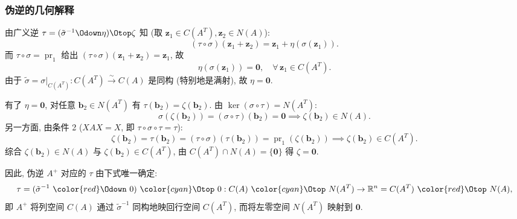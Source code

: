 
\begin{frame}
\frametitle{伪逆的几何解释}

{\color{red}} 由广义逆 $\tau = (\tilde{\sigma}^{-1} \Odown \eta) \Otop \zeta$ 知 (取 $\mathbf{z}_1 \in C(A^T), \mathbf{z}_2 \in N(A)$):
\[
(\tau\circ\sigma)(\mathbf{z}_1 + \mathbf{z}_2) = \mathbf{z}_1 + \eta(\sigma(\mathbf{z}_1)).
\]
而 $\tau\circ\sigma = \operatorname{pr}_1$ 给出 $(\tau\circ\sigma)(\mathbf{z}_1 + \mathbf{z}_2) = \mathbf{z}_1$, 故
\[
\eta(\sigma(\mathbf{z}_1)) = \mathbf{0}, \quad \forall\, \mathbf{z}_1 \in C(A^T).
\]
由于 $\tilde{\sigma} = \sigma|_{C(A^T)}: C(A^T) \overset{\sim}{\to} C(A)$ 是同构 (特别地是满射), 故 $\eta = \mathbf{0}$.

\pause
\vspace{0.5em}

{\color{red}} 有了 $\eta = \mathbf{0}$, 对任意 $\mathbf{b}_2 \in N(A^T)$ 有 $\tau(\mathbf{b}_2) = \zeta(\mathbf{b}_2)$. 由 $\ker(\sigma\circ\tau) = N(A^T)$:
\[
\sigma(\zeta(\mathbf{b}_2)) = (\sigma\circ\tau)(\mathbf{b}_2) = \mathbf{0} \implies \zeta(\mathbf{b}_2) \in N(A).
\]
另一方面, 由条件 2 ($XAX = X$, 即 $\tau\circ\sigma\circ\tau = \tau$):
\[
\zeta(\mathbf{b}_2) = \tau(\mathbf{b}_2) = (\tau\circ\sigma)\left(\tau(\mathbf{b}_2)\right) = \operatorname{pr}_1\left(\zeta(\mathbf{b}_2)\right) \implies \zeta(\mathbf{b}_2) \in C(A^T).
\]
综合 $\zeta(\mathbf{b}_2) \in N(A)$ 与 $\zeta(\mathbf{b}_2) \in C(A^T)$, 由 $C(A^T) \cap N(A) = \{\mathbf{0}\}$ 得 $\zeta = \mathbf{0}$.

\pause
\vspace{0.5em}

因此, 伪逆 $A^+$ 对应的 $\tau$ 由下式唯一确定:
\[
\tau = (\tilde{\sigma}^{-1} ~ {\color{red}\Odown} ~ 0) ~ {\color{cyan}\Otop} ~ 0 : C(A) ~ {\color{cyan}\Otop} ~ N(A^T) \to \mathbb{R}^n = C(A^T) ~ {\color{red}\Otop} ~ N(A),
\]
即 $A^+$ 将列空间 $C(A)$ 通过 $\tilde{\sigma}^{-1}$ 同构地映回行空间 $C(A^T)$, 而将左零空间 $N(A^T)$ 映射到 $\mathbf{0}$.

\end{frame}


